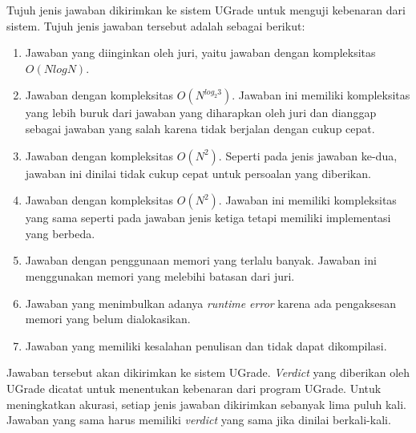\par Tujuh jenis jawaban dikirimkan ke sistem UGrade untuk menguji kebenaran dari sistem. Tujuh jenis jawaban tersebut adalah sebagai berikut:
\begin{enumerate}
	\item Jawaban yang diinginkan oleh juri, yaitu jawaban dengan kompleksitas $O(N log N)$.
	\item Jawaban dengan kompleksitas $O(N^{log_2{3}})$. Jawaban ini memiliki kompleksitas yang lebih buruk dari jawaban yang diharapkan oleh juri dan dianggap sebagai jawaban yang salah karena tidak berjalan dengan cukup cepat.
	\item Jawaban dengan kompleksitas $O(N^2)$. Seperti pada jenis jawaban ke-dua, jawaban ini dinilai tidak cukup cepat untuk persoalan yang diberikan.
	\item Jawaban dengan kompleksitas $O(N^2)$. Jawaban ini memiliki kompleksitas yang sama seperti pada jawaban jenis ketiga tetapi memiliki implementasi yang berbeda.
	\item Jawaban dengan penggunaan memori yang terlalu banyak. Jawaban ini menggunakan memori yang melebihi batasan dari juri.
	\item Jawaban yang menimbulkan adanya \textit{runtime error} karena ada pengaksesan memori yang belum dialokasikan.
	\item Jawaban yang memiliki kesalahan penulisan dan tidak dapat dikompilasi.
\end{enumerate}
Jawaban tersebut akan dikirimkan ke sistem UGrade. \textit{Verdict} yang diberikan oleh UGrade dicatat untuk menentukan kebenaran dari program UGrade. Untuk meningkatkan akurasi, setiap jenis jawaban dikirimkan sebanyak lima puluh kali. Jawaban yang sama harus memiliki \textit{verdict} yang sama jika dinilai berkali-kali.

